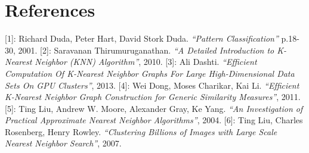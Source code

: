 \section{References}

[1]: Richard Duda, Peter Hart, David Stork Duda. \textit{``Pattern Classification''} p.18-30, 2001.
[2]: Saravanan Thirumuruganathan. \textit{``A Detailed Introduction to K-Nearest Neighbor (KNN) Algorithm''}, 2010. 
[3]: Ali Dashti. \textit{``Efficient Computation Of K-Nearest Neighbor Graphs For Large High-Dimensional Data Sets On GPU Clusters''}, 2013.
[4]: Wei Dong, Moses Charikar, Kai Li. \textit{``Efﬁcient K-Nearest Neighbor Graph Construction for Generic Similarity Measures''}, 2011.
[5]: Ting Liu, Andrew W. Moore, Alexander Gray, Ke Yang. \textit{``An Investigation of Practical Approximate Nearest Neighbor Algorithms''}, 2004.
[6]: Ting Liu, Charles Rosenberg, Henry Rowley. \textit{``Clustering Billions of Images with Large Scale Nearest Neighbor Search''}, 2007.

